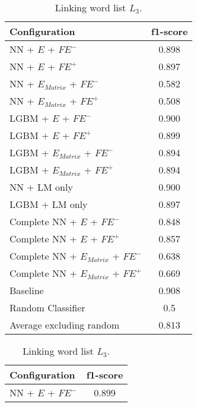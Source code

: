\begin{table}[H]
  	\tiny
  	\centering
	\begin{subtable}{.5\textwidth}
		\centering
  		\renewcommand{\arraystretch}{1.4}
   		\begin{tabular}{|| l || c ||}
   			\hline
   			{Configuration} & {f1-score} \\
   			\hline\hline
   			NN + $E$ + $\textit{FE}^-$ &  0.898 \\
 			\hline
 			NN + $E$ + $\textit{FE}^+$ & 0.897 \\
 			\hline
 			NN + $E_{Matrix}$ + $\textit{FE}^-$ & 0.582 \\
 			\hline
 			NN + $E_{Matrix}$ + $\textit{FE}^+$ & 0.508 \\
 			\hline
 			LGBM + $E$ + $\textit{FE}^-$ & 0.900 \\
 			\hline
 			LGBM + $E$ + $\textit{FE}^+$ & 0.899 \\
 			\hline
 			LGBM + $E_{Matrix}$ + $\textit{FE}^-$ & 0.894 \\
 			\hline
 			LGBM + $E_{Matrix}$ + $\textit{FE}^+$ & 0.894 \\
 			\hline
 			NN + LM only & 0.900 \\
 			\hline
 			LGBM + LM only & 0.897 \\
 			\hline
 			Complete NN + $E$ + $\textit{FE}^-$ & 0.848 \\
 			\hline
 			Complete NN + $E$ + $\textit{FE}^+$ & 0.857 \\
 			\hline
 			Complete NN + $E_{Matrix}$ + $\textit{FE}^-$ & 0.638 \\
 			\hline
 			Complete NN + $E_{Matrix}$ + $\textit{FE}^+$ & 0.669 \\
 			\hline
 			Baseline & 0.908 \\
 			\hline
 			Random Classifier & 0.5 \\
 			\hline
 			\hline
 			Average excluding random & 0.813 \\
 			\hline
		\end{tabular}
		\renewcommand{\arraystretch}{1}
  		\caption{Linking word list $L_3$.}%
  	\end{subtable}%
  	\begin{subtable}{.5\textwidth}
		\centering
  		\renewcommand{\arraystretch}{1.4}
   		\begin{tabular}{|| l || c ||}
   			\hline
   			{Configuration} & {f1-score} \\
   			\hline\hline
   			NN + $E$ + $\textit{FE}^-$ &  0.899 \\

\end{tabular}
\end{subtable}
\end{table}

